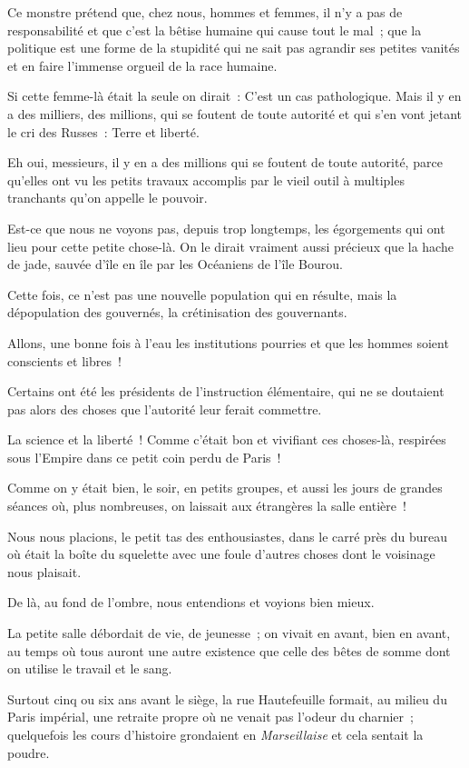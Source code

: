 \documentclass[french,twoside]{book} %
\begin{document}
Ce monstre prétend que, chez nous, hommes et femmes, il n’y a pas de responsabilité et que c’est la bêtise humaine qui cause tout le mal ; que la politique est une forme de la stupidité qui ne sait pas agrandir ses petites vanités et en faire l’immense orgueil de la race humaine.\par
Si cette femme-là était la seule on dirait : C’est un cas pathologique. Mais il y en a des milliers, des millions, qui se foutent de toute autorité et qui s’en vont jetant le cri des Russes : Terre et liberté.\par
Eh oui, messieurs, il y en a des millions qui se foutent de toute autorité, parce qu’elles ont vu les petits travaux accomplis par le vieil outil à multiples tranchants qu’on appelle le pouvoir.\par
Est-ce que nous ne voyons pas, depuis trop longtemps, les égorgements qui ont lieu pour cette petite chose-là. On le dirait vraiment aussi précieux que la hache de jade, sauvée d’île en île par les Océaniens de l’île Bourou.\par
Cette fois, ce n’est pas une nouvelle population qui en résulte, mais la dépopulation des gouvernés, la crétinisation des gouvernants.\par
 Allons, une bonne fois à l’eau les institutions pourries et que les hommes soient conscients et libres !\par
Certains ont été les présidents de l’instruction élémentaire, qui ne se doutaient pas alors des choses que l’autorité leur ferait commettre.\par
La science et la liberté ! Comme c’était bon et vivifiant ces choses-là, respirées sous l’Empire dans ce petit coin perdu de Paris !\par
Comme on y était bien, le soir, en petits groupes, et aussi les jours de grandes séances où, plus nombreuses, on laissait aux étrangères la salle entière !\par
Nous nous placions, le petit tas des enthousiastes, dans le carré près du bureau où était la boîte du squelette avec une foule d’autres choses dont le voisinage nous plaisait.\par
De là, au fond de l’ombre, nous entendions et voyions bien mieux.\par
La petite salle débordait de vie, de jeunesse ; on vivait en avant, bien en avant, au temps où tous auront une autre existence que celle des bêtes de somme dont on utilise le travail et le sang.\par
Surtout cinq ou six ans avant le siège, la rue Hautefeuille formait, au milieu du Paris impérial, une retraite propre où ne venait pas l’odeur du  charnier ; quelquefois les cours d’histoire grondaient en \emph{Marseillaise} et cela sentait la poudre.\par
\end{document}
